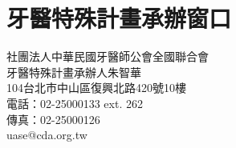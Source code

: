 \begin{longtable}{p{1.3in}p{4.8in}}


\end{longtable}


%
\section{牙醫特殊計畫承辦窗口}
\noindent 社團法人中華民國牙醫師公會全國聯合會\\
牙醫特殊計畫承辦人朱智華\\
104台北市中山區復興北路420號10樓\\
電話：02-25000133 ext. 262\\
傳真：02-25000126\\
uase@cda.org.tw\\